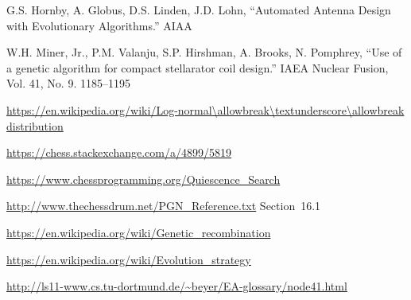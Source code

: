 \documentclass[letterpaper]{article}
\renewcommand{\_}{\allowbreak\textunderscore\allowbreak}
\begin{document}
\begin{thebibliography}{99}

G.S. Hornby, A. Globus, D.S. Linden, J.D. Lohn, ``Automated Antenna Design with Evolutionary Algorithms.'' AIAA

W.H. Miner, Jr., P.M. Valanju, S.P. Hirshman, A. Brooks, N. Pomphrey, ``Use of a genetic algorithm for compact stellarator coil design.'' IAEA Nuclear Fusion, Vol. 41, No. 9. 1185--1195

\url{https://en.wikipedia.org/wiki/Log-normal\_distribution}

\url{https://chess.stackexchange.com/a/4899/5819}

\url{https://www.chessprogramming.org/Quiescence_Search}

\url{http://www.thechessdrum.net/PGN_Reference.txt} Section~16.1

\url{https://en.wikipedia.org/wiki/Genetic_recombination}

\url{https://en.wikipedia.org/wiki/Evolution_strategy}

\url{http://ls11-www.cs.tu-dortmund.de/~beyer/EA-glossary/node41.html}

\end{thebibliography}
\end{document}
